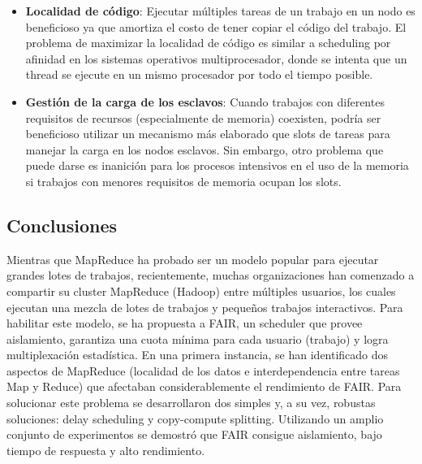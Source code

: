 \begin{itemize}
	\item \textbf{Localidad de código}: Ejecutar múltiples tareas de un trabajo en un nodo es beneficioso ya que amortiza el costo de tener copiar el código del trabajo. El problema de maximizar la localidad de código es similar a scheduling por afinidad en los sistemas operativos multiprocesador, donde se intenta que un thread se ejecute en un mismo procesador por todo el tiempo posible.
	\item \textbf{Gestión de la carga de los esclavos}: Cuando trabajos con diferentes requisitos de recursos (especialmente de memoria) coexisten, podría ser beneficioso utilizar un mecanismo más elaborado que slots de tareas para manejar la carga en los nodos esclavos. Sin embargo, otro problema que puede darse es inanición para los procesos intensivos en el uso de la memoria si trabajos con menores requisitos de memoria ocupan los slots.
\end{itemize}

\subsection{Conclusiones}

Mientras que MapReduce ha probado ser un modelo popular para ejecutar grandes lotes de trabajos, recientemente, muchas organizaciones han comenzado a compartir su cluster MapReduce (Hadoop) entre múltiples usuarios, los cuales ejecutan una mezcla de lotes de trabajos y pequeños trabajos interactivos. Para habilitar este modelo, se ha propuesta a FAIR, un scheduler que provee aislamiento, garantiza una cuota mínima para cada usuario (trabajo) y logra multiplexación estadística. En una primera instancia, se han identificado dos aspectos de MapReduce (localidad de los datos e interdependencia entre tareas Map y Reduce) que afectaban considerablemente el rendimiento de FAIR. Para solucionar este problema se desarrollaron dos simples y, a su vez, robustas soluciones: delay scheduling y copy-compute splitting. Utilizando un amplio conjunto de experimentos se demostró que FAIR consigue aislamiento, bajo tiempo de respuesta y alto rendimiento.
